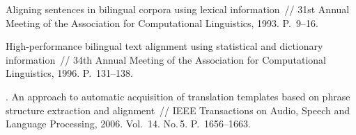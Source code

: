 \begin{multicols}{2}
{{\begin{thebibliography}{99}
 Aligning sentences in bilingual corpora using lexical 
information~// 31st Annual Meeting of the Association for Computational 
Linguistics, 1993. P.~9--16.
{%

}
 High-performance bilingual text alignment using 
statistical and dictionary information~// 34th Annual Meeting of the 
Association for Computational Linguistics, 1996. P.~131--138. 
{%

}
. An approach to automatic acquisition of 
translation templates based on phrase structure extraction and alignment~// 
IEEE Transactions on Audio, Speech and Language Processing, 2006. Vol.~14. 
No.\,5. P.~1656--1663. 
{

}
\end{thebibliography}

}
}


\end{multicols}

\label{end\stat}